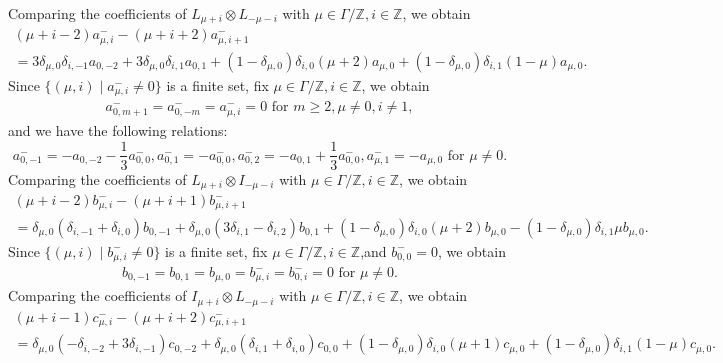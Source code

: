 \documentclass{amsart}
\theoremstyle{definition}
\theoremstyle{remark}
\numberwithin{equation}{subsection}
\numberwithin{equation}{section}
\begin{document}
Comparing the coefficients of $L_{\mu+i} \otimes L_{-\mu-i}$  with
$\mu\in \Gamma/\mathbb{Z},i\in \mathbb{Z}$, we obtain
$$\begin{array}{lll}
(\mu+i-2)a^{-}_{\mu,i}-(\mu+i+2)a^{-}_{\mu,i+1}    \\[12pt]
=3\delta_{\mu,0}\delta_{i,-1}a_{0,-2}+3\delta_{\mu,0}\delta_{i,1}a_{0,1}
+(1-\delta_{\mu,0})\delta_{i,0}(\mu+2)a_{\mu,0}+(1-\delta_{\mu,0})\delta_{i,1}(1-\mu)a_{\mu,0}.
\end{array}$$
Since $\{(\mu,i)\mid a^{-}_{\mu,i}\neq 0 \}$  is a finite set, fix
$\mu\in \Gamma/\mathbb{Z},i\in \mathbb{Z}$,     we obtain
$$\begin{array}{llll}
a^{-}_{0,m+1}=a^{-}_{0,-m}=a^{-}_{\mu,i}=0 \mbox{ \ for \ } m\geq 2,
\mu\neq 0, i\neq 1,
\end{array}$$
and we have the following relations:
\begin{equation}
\label{equa2.11} a^{-}_{0,-1}=-a_{0,-2}-\frac{1}{3}a^{-}_{0,0},
a^{-}_{0,1}= -a^{-}_{0,0},
a^{-}_{0,2}=-a_{0,1}+\frac{1}{3}a^{-}_{0,0}, a^{-}_{\mu,1}
=-a_{\mu,0} \mbox{ \ for \ } \mu\neq 0.
\end{equation}
Comparing the coefficients of $L_{\mu+i} \otimes I_{-\mu-i}$  with
$\mu\in \Gamma/\mathbb{Z},i\in \mathbb{Z}$, we obtain
$$\begin{array}{llll}
 (\mu+i-2)b^{-}_{\mu,i}-(\mu+i+1)b^{-}_{\mu,i+1}    \\[12pt]
 =\delta_{\mu,0}(\delta_{i,-1}+\delta_{i,0})b_{0,-1}+\delta_{\mu,0}(3\delta_{i,1}-\delta_{i,2})b_{0,1}
 +(1-\delta_{\mu,0})\delta_{i,0}(\mu+2)b_{\mu,0}-(1-\delta_{\mu,0})\delta_{i,1}\mu
 b_{\mu,0}.
 \end{array}$$
Since $\{(\mu,i)\mid b^{-}_{\mu,i}\neq 0 \}$  is a finite set, fix
$\mu\in \Gamma/\mathbb{Z},i\in \mathbb{Z}$,and $b^{-}_{0,0}=0$, we
obtain
 $$\begin{array}{llll}
 b_{0,-1}=b_{0,1}=b_{\mu,0}
 =b^{-}_{\mu,i}=b^{-}_{0,i}=0  \mbox{ \ for \ } \mu\neq 0.
 \end{array}$$
Comparing the coefficients of $I_{\mu+i} \otimes L_{-\mu-i}$  with
  $\mu\in \Gamma/\mathbb{Z},i\in \mathbb{Z}$, we obtain
  $$\begin{array}{llll}
  (\mu+i-1)c^{-}_{\mu,i}-(\mu+i+2)c^{-}_{\mu,i+1}    \\[12pt]
  =\delta_{\mu,0}(-\delta_{i,-2}+3\delta_{i,-1})c_{0,-2}+\delta_{\mu,0}(\delta_{i,1}+\delta_{i,0})c_{0,0}
  +(1-\delta_{\mu,0})\delta_{i,0}(\mu+1)c_{\mu,0}+(1-\delta_{\mu,0})\delta_{i,1}(1-\mu)
  c_{\mu,0}.
  \end{array}$$
\end{document}
